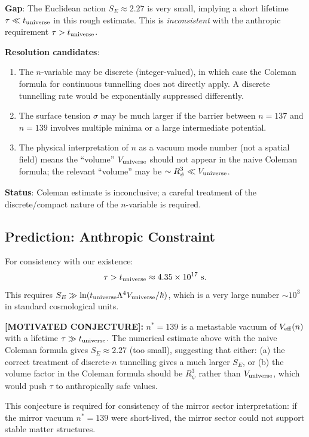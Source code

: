\documentclass[12pt]{article}
\theoremstyle{definition}
\theoremstyle{remark}
\begin{document}
\begin{gapbox}
\textbf{Gap}: The Euclidean action $S_E \approx 2.27$ is very small, implying a
short lifetime $\tau \ll t_{\rm universe}$ in this rough estimate.  This is
\emph{inconsistent} with the anthropic requirement $\tau > t_{\rm universe}$.

\medskip
\textbf{Resolution candidates}:
\begin{enumerate}
  \item The $n$-variable may be discrete (integer-valued), in which case the
        Coleman formula for continuous tunnelling does not directly apply.
        A discrete tunnelling rate would be exponentially suppressed differently.
  \item The surface tension $\sigma$ may be much larger if the barrier between
        $n=137$ and $n=139$ involves multiple minima or a large intermediate potential.
  \item The physical interpretation of $n$ as a vacuum mode number (not a spatial
        field) means the ``volume'' $V_{\rm universe}$ should not appear in the
        naive Coleman formula; the relevant ``volume'' may be $\sim R_\psi^3 \ll V_{\rm universe}$.
\end{enumerate}
\textbf{Status}: Coleman estimate is inconclusive; a careful treatment of the
discrete/compact nature of the $n$-variable is required.
\end{gapbox}

\subsection{Prediction: Anthropic Constraint}

For consistency with our existence:
\begin{equation}
  \tau > t_{\rm universe} \approx 4.35 \times 10^{17}~\text{s}.
  \label{eq:anthropic}
\end{equation}
This requires $S_E \gg \ln(t_{\rm universe} \Lambda^4 V_{\rm universe}/\hbar)$,
which is a very large number $\sim 10^3$ in standard cosmological units.

\begin{conjecturebox}
\textbf{[MOTIVATED CONJECTURE]:}
$n^* = 139$ is a metastable vacuum of $V_{\rm eff}(n)$ with a lifetime
$\tau \gg t_{\rm universe}$.  The numerical estimate above with the naive
Coleman formula gives $S_E \approx 2.27$ (too small), suggesting that either:
(a) the correct treatment of discrete-$n$ tunnelling gives a much larger $S_E$, or
(b) the volume factor in the Coleman formula should be $R_\psi^3$ rather than
$V_{\rm universe}$, which would push $\tau$ to anthropically safe values.

\medskip
This conjecture is required for consistency of the mirror sector interpretation:
if the mirror vacuum $n^*=139$ were short-lived, the mirror sector could not
support stable matter structures.
\end{conjecturebox}
\end{document}
